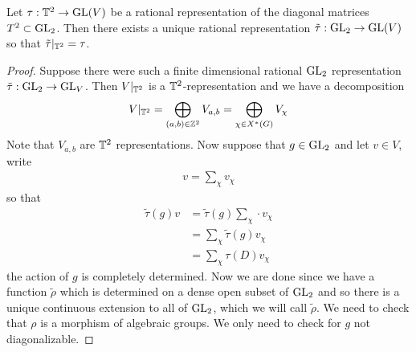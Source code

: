 \documentclass[12pt]{article}
\begin{document}
\begin{theorem}
    Let $\tau:\mathbb{T}^2\to\operatorname{GL}(V)$ be a rational representation of the diagonal matrices $T^2\subset\operatorname{GL}_2$. Then there exists a unique rational representation $\tilde\tau:\operatorname{GL}_2\to\operatorname{GL}(V)$ so that $\tilde\tau\vert_{\mathbb{T}^2} = \tau$.
\end{theorem}
\begin{proof}
   Suppose there were such a finite dimensional rational $\operatorname{GL}_2$ representation $\tilde\tau:\operatorname{GL}_2\to\operatorname{GL}_V$. Then $V\vert_{\mathbb{T}^2}$ is a $\mathbb{T}^2$-representation and we have a decomposition \begin{align*}
    V\vert_{\mathbb{T}^2} = \bigoplus_{(a,b)\in\mathbb{Z}^2}V_{a,b} = \bigoplus_{\chi\in X^*(G)}V_\chi
\end{align*} Note that $V_{a,b}$ are $\mathbb{T}^2$ representations. Now suppose that $g\in \operatorname{GL}_2$ and let $v\in V$, write \begin{align*}
    v = \sum_{\chi}v_\chi
\end{align*} so that \begin{align*}
    \tilde\tau(g)v &= \tilde\tau(g)\sum_\chi \cdot v_\chi \\
    &= \sum_\chi \tilde\tau(g)v_\chi \\
    &= \sum_\chi \tau(D)v_\chi
\end{align*} the action of $g$ is completely determined. Now we are done since we have a function $\tilde\rho$ which is determined on a dense open subset of $\operatorname{GL}_2$ and so there is a unique continuous extension to all of $\operatorname{GL}_2$, which we will call $\tilde\rho$. We need to check that $\rho$ is a morphism of algebraic groups. We only need to check for $g$ not diagonalizable.

\hfill


\end{proof}
\end{document}
